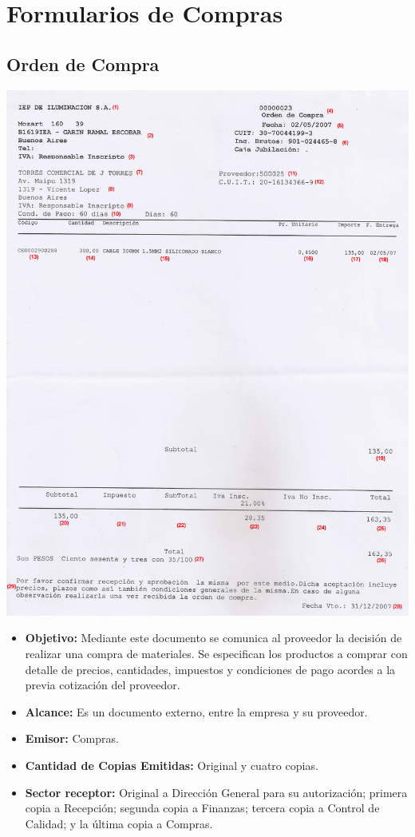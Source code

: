\pagebreak
\section{Formularios de Compras}
\subsection{Orden de Compra}
\begin{center}
 \includegraphics[scale=3.2, keepaspectratio=true]{./Images/FormulariosIEP/Orden-de-Compra.png}
\end{center}
\begin{itemize}
  \item \textbf{Objetivo:} Mediante este documento se comunica al proveedor la decisión de realizar una compra de materiales. Se especifican los productos a comprar con detalle de precios, cantidades, impuestos y condiciones de pago acordes a la previa cotización del proveedor.
  \item \textbf{Alcance:} Es un documento externo, entre la empresa y su proveedor.
  \item \textbf{Emisor:} Compras.
  \item \textbf{Cantidad de Copias Emitidas:} Original y cuatro copias.
  \item \textbf{Sector receptor:} Original a Dirección General para su autorización; primera copia a Recepci\'on; segunda copia a Finanzas; tercera copia a Control de Calidad; y la \'ultima copia a Compras.
 \end{itemize}
